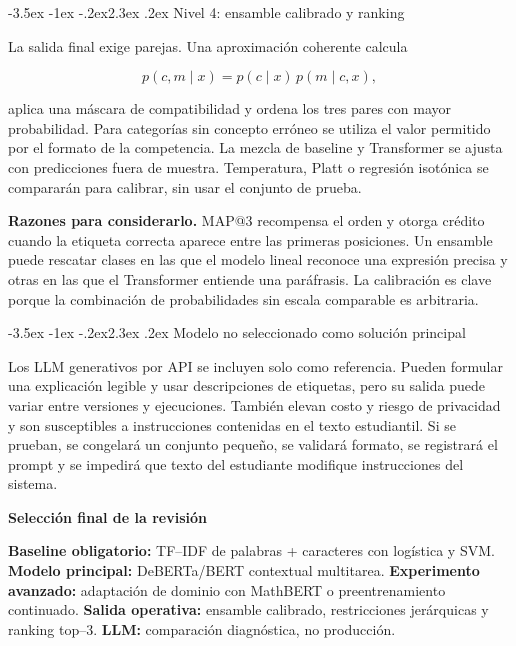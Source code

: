 \documentclass[11pt,oneside,openany]{book}
\makeatletter
\renewcommand\section{\@startsection{section}{1}{\z@}%
  {-3.5ex \@plus -1ex \@minus -.2ex}{2.3ex \@plus .2ex}%
  {\normalfont\Large\sffamily\bfseries\color{AzulMedio}}}
\newenvironment{decision}[1][]{%
  \begin{lrbox}{\infobox}\begin{minipage}{0.92\textwidth}
  \color{GrisTexto}\sffamily\textbf{#1}\par\smallskip\rmfamily}
  {\end{minipage}\end{lrbox}\par\medskip\noindent
   \colorbox{VerdeClaro}{\usebox{\infobox}}\par\medskip}
\makeatother
\begin{document}
\section{Nivel 4: ensamble calibrado y ranking}

La salida final exige parejas. Una aproximación coherente calcula

\[
p(c,m\mid x)=p(c\mid x)\,p(m\mid c,x),
\]

aplica una máscara de compatibilidad y ordena los tres pares con mayor
probabilidad. Para categorías sin concepto erróneo se utiliza el valor permitido
por el formato de la competencia. La mezcla de baseline y Transformer se ajusta
con predicciones fuera de muestra. Temperatura, Platt o regresión isotónica se
compararán para calibrar, sin usar el conjunto de prueba.

\textbf{Razones para considerarlo.} MAP@3 recompensa el orden y otorga crédito
cuando la etiqueta correcta aparece entre las primeras posiciones. Un ensamble
puede rescatar clases en las que el modelo lineal reconoce una expresión precisa y
otras en las que el Transformer entiende una paráfrasis. La calibración es clave
porque la combinación de probabilidades sin escala comparable es arbitraria.

\section{Modelo no seleccionado como solución principal}

Los LLM generativos por API se incluyen solo como referencia. Pueden formular una
explicación legible y usar descripciones de etiquetas, pero su salida puede variar
entre versiones y ejecuciones. También elevan costo y riesgo de privacidad y son
susceptibles a instrucciones contenidas en el texto estudiantil. Si se prueban,
se congelará un conjunto pequeño, se validará formato, se registrará el prompt y
se impedirá que texto del estudiante modifique instrucciones del sistema.

\begin{decision}[Selección final de la revisión]
\textbf{Baseline obligatorio:} TF--IDF de palabras + caracteres con logística y
SVM. \textbf{Modelo principal:} DeBERTa/BERT contextual multitarea.
\textbf{Experimento avanzado:} adaptación de dominio con MathBERT o preentrenamiento
continuado. \textbf{Salida operativa:} ensamble calibrado, restricciones
jerárquicas y ranking top--3. \textbf{LLM:} comparación diagnóstica, no producción.
\end{decision}
\end{document}
